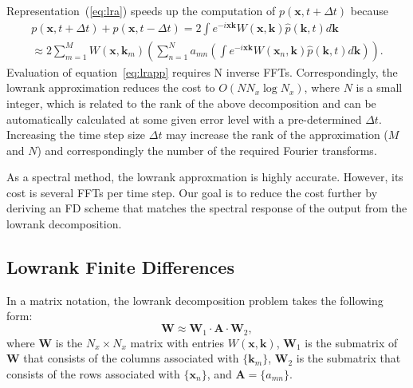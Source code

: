 Representation~(\ref{eq:lra}) speeds up the computation of
$p(\mathbf{x},t+\Delta t)$ because 
\begin{eqnarray}
\nonumber
  p(\mathbf{x},t+\Delta t) + p(\mathbf{x},t-\Delta t) = 2 \int e^{-i
    \mathbf{x} \mathbf{k}} W(\mathbf{x},\mathbf{k})
  \hat{p}(\mathbf{k},t) d \mathbf{k} \\
 \approx 2 \sum\limits_{m=1}^M W(\mathbf{x},\mathbf{k}_m) \left(
   \sum\limits_{n=1}^N a_{mn} \left(\int e^{-i \mathbf{x}\mathbf{k}}
     W(\mathbf{x}_n,\mathbf{k}) \hat{p}(\mathbf{k},t) d\mathbf{k}
   \right) \right).
  \label{eq:lrapp}
\end{eqnarray}
Evaluation of equation~\ref{eq:lrapp} requires N inverse FFTs. 
Correspondingly, the lowrank approximation reduces the cost to $O(NN_x\log N_x)$, where $N$ is a small integer,
which is related to the rank of the above decomposition
and can be automatically calculated at some given error level with a pre-determined $\Delta t$.
Increasing the time step size $\Delta t$ may increase the rank of the
approximation ($M$ and $N$) and correspondingly the number of the required Fourier
transforms.


As a spectral method, the lowrank approxmation is highly accurate. 
However, its cost is several FFTs per time step.
Our goal is to reduce the cost further by deriving an FD scheme that matches 
the spectral response of the output from the lowrank decomposition.



\subsection{Lowrank Finite Differences}

In a matrix notation, the lowrank decomposition problem takes the following form:
\begin{equation}
  \label{eq:lramatrix}
  \mathbf{W} \approx \mathbf{W}_1 \cdot \mathbf{A} \cdot \mathbf{W}_2,
\end{equation} 
where $\mathbf{W}$ is the $N_x\times N_x$ matrix with entries
$W(\mathbf{x},\mathbf{k})$, $\mathbf{W}_1$ is the submatrix of $\mathbf{W}$ that
consists of the columns associated with $\{\mathbf{k}_m\}$, $\mathbf{W}_2$ is
the submatrix that consists of the rows associated with $\{\mathbf{x}_n\}$,
and $\mathbf{A} = \{a_{mn}\}$.

